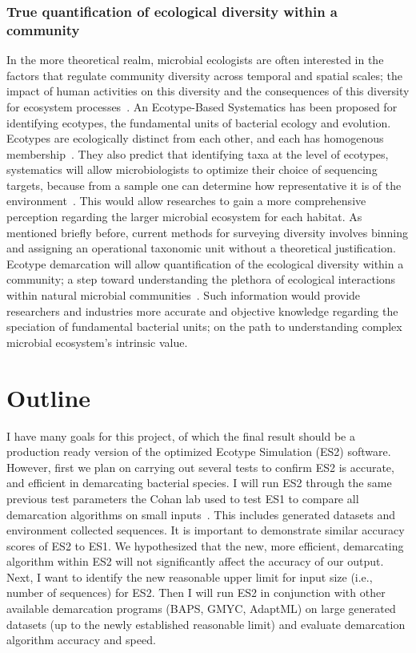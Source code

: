 \subsubsection*{True quantification of ecological diversity within a community}
In the more theoretical realm, microbial ecologists are often interested in the factors that regulate community diversity across temporal and spatial scales; the impact of human activities on this diversity and the consequences of this diversity for ecosystem processes~\cite{bohannan2003new}.
An Ecotype-Based Systematics has been proposed for identifying ecotypes, the fundamental units of bacterial ecology and evolution.
Ecotypes are ecologically distinct from each other, and each has homogenous membership~\cite{cohan2007systematics}.
They also predict that identifying taxa at the level of ecotypes, systematics will allow microbiologists to optimize their choice of sequencing targets, because from a sample one can determine how representative it is of the environment~\cite{bohannan2003new}.
This would allow researches to gain a more comprehensive perception regarding the larger microbial ecosystem for each habitat.
As mentioned briefly before, current methods for surveying diversity involves binning and assigning an operational taxonomic unit without a theoretical justification.
Ecotype demarcation will allow quantification of the ecological diversity within a community; a step toward understanding the plethora of ecological interactions within natural microbial communities~\cite{cohan2007systematics}.
Such information would provide researchers and industries more accurate and objective knowledge regarding the speciation of fundamental bacterial units; on the path to understanding complex microbial ecosystem's intrinsic value.


\section{Outline}
I have many goals for this project, of which the final result should be a production ready version of the optimized Ecotype Simulation (ES2) software.
However, first we plan on carrying out several tests to confirm ES2 is accurate, and efficient in demarcating bacterial species.
I will run ES2 through the same previous test parameters the Cohan lab used to test ES1 to compare all demarcation algorithms on small inputs~\cite{carlo}.
This includes generated datasets and environment collected sequences.
It is important to demonstrate similar accuracy scores of ES2 to ES1.
We hypothesized that the new, more efficient, demarcating algorithm within ES2 will not significantly affect the accuracy of our output.
Next, I want to identify the new reasonable upper limit for input size (i.e., number of sequences) for ES2.
Then I will run ES2 in conjunction with other available demarcation programs (BAPS, GMYC, AdaptML) on large generated datasets (up to the newly established reasonable limit) and evaluate demarcation algorithm accuracy and speed.


